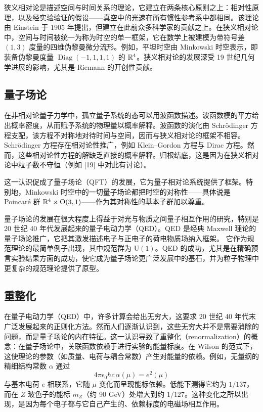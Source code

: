 狭义相对论是描述空间与时间关系的理论，它建立在两条核心原则之上：相对性原理，以及经实验验证的假设——真空中的光速在所有惯性参考系中都相同。该理论由 Einstein 于 1905 年提出，但建立在此前众多科学家的贡献之上。在狭义相对论中，空间与时间被统一为称为时空的单一框架，它在数学上被建模为带符号差 $(1,3)$ 度量的四维伪黎曼微分流形。例如，平坦时空由 Minkowski 时空表示，即装备伪黎曼度量 $\operatorname{Diag}(-1,1,1,1)$ 的 $\mathbb{R}^4$。狭义相对论的发展深受 19 世纪几何学进展的影响，尤其是 Riemann 的开创性贡献。

\subsection*{量子场论}

在非相对论量子力学中，孤立量子系统的态可以用波函数描述。波函数模的平方给出概率密度，从而赋予系统的物理量以概率解释。波函数的演化由 Schrödinger 方程支配，该方程不对称地对待时间与空间，因而与狭义相对论的框架不相容。Schrödinger 方程存在相对论性推广，例如 Klein--Gordon 方程与 Dirac 方程。然而，这些相对论性方程的解缺乏直接的概率解释。归根结底，这是因为在狭义相对论中粒子数不守恒（例如 [19] 中对此有讨论）。

这一认识促成了量子场论（QFT）的发展，它为量子相对论系统提供了框架。特别地，Minkowski 时空中的一切量子场论都把时空的对称性——具体说是 Poincaré 群 $\mathbb{R}^4\rtimes \mathrm{O}(3,1)$——作为其对称性的基本子群加以尊重。

量子场论的发展在很大程度上得益于对光与物质之间量子相互作用的研究，特别是 20 世纪 40 年代发展起来的量子电动力学（QED）。QED 是经典 Maxwell 理论的量子场论推广，它把其激发描述电子与正电子的荷电物质场纳入框架。
它作为规范理论的最简单例子出现，其中规范群为 $\mathrm{U}(1)$。QED 的成功，尤其是在精确预言实验结果方面的成功，使它成为量子场论更广泛发展中的基石，并为粒子物理中更复杂的规范理论提供了原型。

\subsection*{重整化}

在量子电动力学（QED）中，许多计算会给出无穷大，这要求 20 世纪 40 年代末广泛发展起来的正则化方法。然而人们逐渐认识到，这些无穷大并不是需要消除的问题，而是量子场论的内在特征。这一认识导致了重整化（renormalization）的概念：在量子场论中，关联函数依赖于进行实验的能量标度。在 Wilson 的范式下，这使理论的参数（如质量、电荷与耦合常数）产生对能量的依赖。例如，无量纲的精细结构常数 $\alpha$ 通过
\[
4\pi\epsilon_0\hbar c\,\alpha(\mu)=e^2(\mu)
\]
与基本电荷 $e$ 相联系，它随 $\mu$ 变化而呈现能标依赖。低能下测得它约为 $1/137$，而在 $Z$ 玻色子的能标 $m_Z$（约 90 GeV）处增大到约 $1/127$。这种变化之所以出现，是因为每个电子都与它自己产生的、依赖标度的电磁场相互作用。

